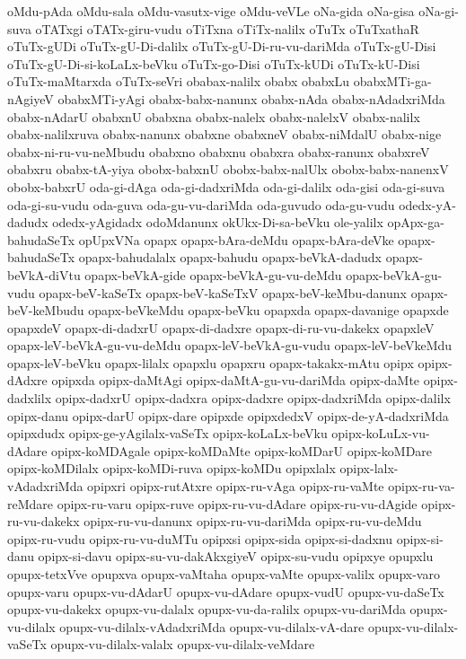 {oMdu-pAda
oMdu-sala
oMdu-vasutx-vige
oMdu-veVLe
oNa-gida
oNa-gisa
oNa-gi-suva
oTATxgi
oTATx-giru-vudu
oTiTxna
oTiTx-nalilx
oTuTx
oTuTxathaR
oTuTx-gUDi
oTuTx-gU-Di-dalilx
oTuTx-gU-Di-ru-vu-dariMda
oTuTx-gU-Disi
oTuTx-gU-Di-si-koLaLx-beVku
oTuTx-go-Disi
oTuTx-kUDi
oTuTx-kU-Disi
oTuTx-maMtarxda
oTuTx-seVri
obabax-nalilx
obabx
obabxLu
obabxMTi-ga-nAgiyeV
obabxMTi-yAgi
obabx-babx-nanunx
obabx-nAda
obabx-nAdadxriMda
obabx-nAdarU
obabxnU
obabxna
obabx-nalelx
obabx-nalelxV
obabx-nalilx
obabx-nalilxruva
obabx-nanunx
obabxne
obabxneV
obabx-niMdalU
obabx-nige
obabx-ni-ru-vu-neMbudu
obabxno
obabxnu
obabxra
obabx-ranunx
obabxreV
obabxru
obabx-tA-yiya
obobx-babxnU
obobx-babx-nalUlx
obobx-babx-nanenxV
obobx-babxrU
oda-gi-dAga
oda-gi-dadxriMda
oda-gi-dalilx
oda-gisi
oda-gi-suva
oda-gi-su-vudu
oda-guva
oda-gu-vu-dariMda
oda-guvudo
oda-gu-vudu
odedx-yA-dadudx
odedx-yAgidadx
odoMdanunx
okUkx-Di-sa-beVku
ole-yalilx
opApx-ga-bahudaSeTx
opUpxVNa
opapx
opapx-bAra-deMdu
opapx-bAra-deVke
opapx-bahudaSeTx
opapx-bahudalalx
opapx-bahudu
opapx-beVkA-dadudx
opapx-beVkA-diVtu
opapx-beVkA-gide
opapx-beVkA-gu-vu-deMdu
opapx-beVkA-gu-vudu
opapx-beV-kaSeTx
opapx-beV-kaSeTxV
opapx-beV-keMbu-danunx
opapx-beV-keMbudu
opapx-beVkeMdu
opapx-beVku
opapxda
opapx-davanige
opapxde
opapxdeV
opapx-di-dadxrU
opapx-di-dadxre
opapx-di-ru-vu-dakekx
opapxleV
opapx-leV-beVkA-gu-vu-deMdu
opapx-leV-beVkA-gu-vudu
opapx-leV-beVkeMdu
opapx-leV-beVku
opapx-lilalx
opapxlu
opapxru
opapx-takakx-mAtu
opipx
opipx-dAdxre
opipxda
opipx-daMtAgi
opipx-daMtA-gu-vu-dariMda
opipx-daMte
opipx-dadxlilx
opipx-dadxrU
opipx-dadxra
opipx-dadxre
opipx-dadxriMda
opipx-dalilx
opipx-danu
opipx-darU
opipx-dare
opipxde
opipxdedxV
opipx-de-yA-dadxriMda
opipxdudx
opipx-ge-yAgilalx-vaSeTx
opipx-koLaLx-beVku
opipx-koLuLx-vu-dAdare
opipx-koMDAgale
opipx-koMDaMte
opipx-koMDarU
opipx-koMDare
opipx-koMDilalx
opipx-koMDi-ruva
opipx-koMDu
opipxlalx
opipx-lalx-vAdadxriMda
opipxri
opipx-rutAtxre
opipx-ru-vAga
opipx-ru-vaMte
opipx-ru-va-reMdare
opipx-ru-varu
opipx-ruve
opipx-ru-vu-dAdare
opipx-ru-vu-dAgide
opipx-ru-vu-dakekx
opipx-ru-vu-danunx
opipx-ru-vu-dariMda
opipx-ru-vu-deMdu
opipx-ru-vudu
opipx-ru-vu-duMTu
opipxsi
opipx-sida
opipx-si-dadxnu
opipx-si-danu
opipx-si-davu
opipx-su-vu-dakAkxgiyeV
opipx-su-vudu
opipxye
opupxlu
opupx-tetxVve
opupxva
opupx-vaMtaha
opupx-vaMte
opupx-valilx
opupx-varo
opupx-varu
opupx-vu-dAdarU
opupx-vu-dAdare
opupx-vudU
opupx-vu-daSeTx
opupx-vu-dakekx
opupx-vu-dalalx
opupx-vu-da-ralilx
opupx-vu-dariMda
opupx-vu-dilalx
opupx-vu-dilalx-vAdadxriMda
opupx-vu-dilalx-vA-dare
opupx-vu-dilalx-vaSeTx
opupx-vu-dilalx-valalx
opupx-vu-dilalx-veMdare
}

